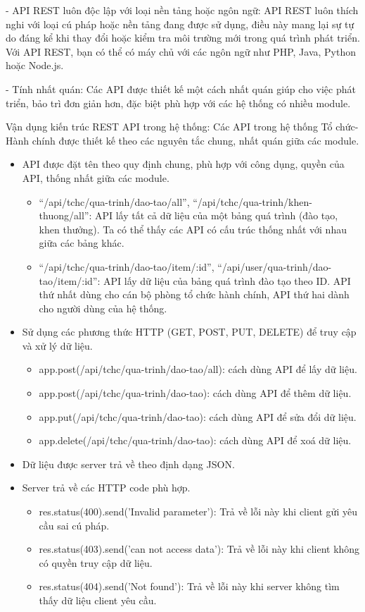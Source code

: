 - API REST luôn độc lập với loại nền tảng hoặc ngôn ngữ: API REST luôn thích nghi với loại cú pháp hoặc nền tảng đang được sử dụng, điều này mang lại sự tự do đáng kể khi thay đổi hoặc kiểm tra môi trường mới trong quá trình phát triển. Với API REST, bạn có thể có máy chủ với các ngôn ngữ như PHP, Java, Python hoặc Node.js.

- Tính nhất quán: Các API được thiết kế một cách nhất quán giúp cho việc phát triển, bảo trì đơn giản hơn, đặc biệt phù hợp với các hệ thống có nhiều module.

Vận dụng kiến trúc REST API trong hệ thống:
Các API trong hệ thống Tổ chức-Hành chính được thiết kế theo các nguyên tắc chung, nhất quán giữa các module.
\begin{itemize}
    \item API được đặt tên theo quy định chung, phù hợp với công dụng, quyền của API, thống nhất giữa các module.
    \begin{itemize}
        \item  ``/api/tchc/qua-trinh/dao-tao/all'', ``/api/tchc/qua-trinh/khen-thuong/all'': API lấy tất cả dữ liệu của một bảng quá trình (đào tạo, khen thưởng). Ta có thể thấy các API có cấu trúc thống nhất với nhau giữa các bảng khác.
        \item  ``/api/tchc/qua-trinh/dao-tao/item/:id'', ``/api/user/qua-trinh/dao-tao/item/:id'': API lấy dữ liệu của bảng quá trình đào tạo theo ID. API thứ nhất dùng cho cán bộ phòng tổ chức hành chính, API thứ hai dành cho người dùng của hệ thống.
    \end{itemize}
    \item Sử dụng các phương thức HTTP (GET, POST, PUT, DELETE) để truy cập và xử lý dữ liệu.
    \begin{itemize}
        \item  app.post(/api/tchc/qua-trinh/dao-tao/all): cách dùng API để lấy dữ liệu.
        \item  app.post(/api/tchc/qua-trinh/dao-tao): cách dùng API để thêm dữ liệu.
        \item  app.put(/api/tchc/qua-trinh/dao-tao): cách dùng API để sửa đổi dữ liệu.
        \item  app.delete(/api/tchc/qua-trinh/dao-tao): cách dùng API để xoá dữ liệu.
    \end{itemize}
    \item Dữ liệu được server trả về theo định dạng JSON.
    \item Server trả về các HTTP code phù hợp.
    \begin{itemize}
        \item  res.status(400).send('Invalid parameter'): Trả về lỗi này khi client gửi yêu cầu sai cú pháp.
        \item  res.status(403).send('can not access data'): Trả về lỗi này khi client không có quyền truy cập dữ liệu.
        \item  res.status(404).send('Not found'): Trả về lỗi này khi server không tìm thấy dữ liệu client yêu cầu.
    \end{itemize}
\end{itemize}
